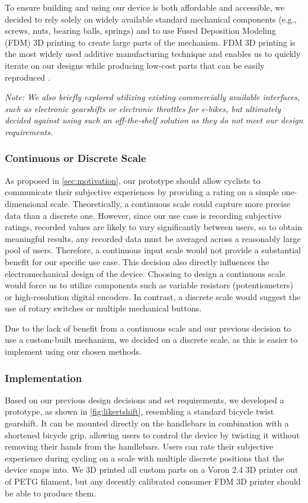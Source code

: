 To ensure building and using our device is both affordable and accessible, we decided to rely solely on widely available standard mechanical components (e.g., screws, nuts, bearing balls, springs) and to use Fused Deposition Modeling (FDM) 3D printing to create large parts of the mechanism.
FDM 3D printing is the most widely used additive manufacturing technique and enables us to quickly iterate on our designs while producing low-cost parts that can be easily reproduced \cite{additive_manufacturing}.

\bigbreak\noindent
\textit{%
    Note: We also briefly explored utilizing existing commercially available interfaces, such as electronic gearshifts or electronic throttles for e-bikes, but ultimately decided against using such an off-the-shelf solution as they do not meet our design requirements.
}

\subsubsection*{Continuous or Discrete Scale}

As proposed in \autoref{sec:motivation}, our prototype should allow cyclists to communicate their subjective experiences by providing a rating on a simple one-dimensional scale.
Theoretically, a continuous scale could capture more precise data than a discrete one.
However, since our use case is recording subjective ratings, recorded values are likely to vary significantly between users, so to obtain meaningful results, any recorded data must be averaged across a reasonably large pool of users.
Therefore, a continuous input scale would not provide a substantial benefit for our specific use case.
This decision also directly influences the electromechanical design of the device.
Choosing to design a continuous scale would force us to utilize components such as variable resistors (potentiometers) or high-resolution digital encoders.
In contrast, a discrete scale would suggest the use of rotary switches or multiple mechanical buttons.

Due to the lack of benefit from a continuous scale and our previous decision to use a custom-built mechanism, we decided on a discrete scale, as this is easier to implement using our chosen methods.

\subsubsection{Implementation}

Based on our previous design decisions and set requirements, we developed a prototype, as shown in \autoref{fig:likertshift}, resembling a standard bicycle twist gearshift.
It can be mounted directly on the handlebars in combination with a shortened bicycle grip, allowing users to control the device by twisting it without removing their hands from the handlebars.
Users can rate their subjective experience during cycling on a scale with multiple discrete positions that the device snaps into.
We 3D printed all custom parts on a Voron 2.4 3D printer out of PETG filament, but any decently calibrated consumer FDM 3D printer should be able to produce them.

